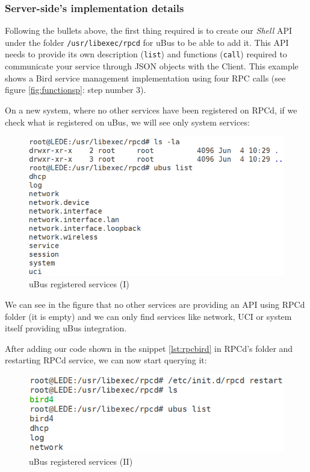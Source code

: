 \subsubsection{Server-side's implementation details}
Following the bullets above, the first thing required is to create our \textit{Shell} API under the folder \texttt{/usr/libexec/rpcd} for uBus to be able to add it. This API needs to provide its own description (\texttt{list}) and functions (\texttt{call}) required to communicate your service through JSON objects with the Client. This example shows a Bird service management implementation using four RPC calls (see figure \ref{fig:functionsp}: step number 3).



On a new system, where no other services have been registered on RPCd, if we check what is registered on uBus, we will see only system services:

\begin{figure}[H]
    \centering
    \includegraphics[width=\textwidth]{images/luci2/step1}
    \caption{uBus registered services (I)}
    \label{fig:ubusrs1}
\end{figure}

We can see in the figure that no other services are providing an API using RPCd folder (it is empty) and we can only find services like network, UCI or system itself providing uBus integration.

After adding our code shown in the snippet \ref{lst:rpcbird} in RPCd's folder and restarting RPCd service, we can now start querying it:

\begin{figure}[H]
    \centering
    \includegraphics[width=\textwidth]{images/luci2/step2}
    \caption{uBus registered services (II)}
    \label{fig:ubusrs2}
\end{figure}

